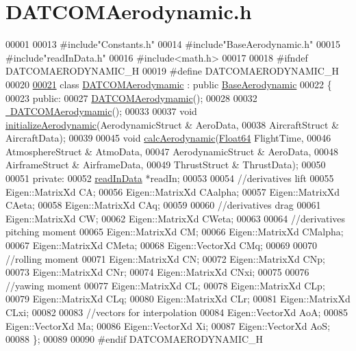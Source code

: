 \hypertarget{_d_a_t_c_o_m_aerodynamic_8h_source}{}\section{D\+A\+T\+C\+O\+M\+Aerodynamic.\+h}
\label{_d_a_t_c_o_m_aerodynamic_8h_source}

\begin{DoxyCode}
00001 
00013 \textcolor{preprocessor}{#include"Constants.h"}
00014 \textcolor{preprocessor}{#include"BaseAerodynamic.h"}
00015 \textcolor{preprocessor}{#include"readInData.h"}
00016 \textcolor{preprocessor}{#include<math.h>}
00017 
00018 \textcolor{preprocessor}{#ifndef DATCOMAERODYNAMIC\_H}
00019 \textcolor{preprocessor}{#define DATCOMAERODYNAMIC\_H}
00020 
\hyperlink{group___aerodynamic}{00021} \textcolor{keyword}{class }\hyperlink{group___aerodynamic_class_d_a_t_c_o_m_aerodymamic}{DATCOMAerodymamic} : \textcolor{keyword}{public} \hyperlink{group___aerodynamic_class_base_aerodynamic}{BaseAerodynamic}
00022 \{
00023 \textcolor{keyword}{public}:
00027     \hyperlink{group___aerodynamic_a03d01a72cf389483e03e2bf6cce33299}{DATCOMAerodymamic}();
00028 
00032     \hyperlink{group___aerodynamic_a3619e38867cad4b0c8b06a939281a74e}{~DATCOMAerodymamic}();
00033 
00037     \textcolor{keywordtype}{void} \hyperlink{group___aerodynamic_ae739c87d390f0ae0a293985478ff5d72}{initializeAerodynamic}(AerodynamicStruct & AeroData, 
00038                                AircraftStruct & AircraftData);
00039 
00045     \textcolor{keywordtype}{void} \hyperlink{group___aerodynamic_a2c31940a25ec9396657d701ef3004327}{calcAerodynamic}(\hyperlink{group___tools_ga3f1431cb9f76da10f59246d1d743dc2c}{Float64} FlightTime,
00046                         AtmosphereStruct & AtmoData,
00047                         AerodynamicStruct & AeroData,
00048                         AirframeStruct & AirframeData,
00049                         ThrustStruct & ThrustData);
00050 
00051 \textcolor{keyword}{private}:
00052     \hyperlink{classread_in_data}{readInData} *readIn;
00053 
00054     \textcolor{comment}{//derivatives lift}
00055     Eigen::MatrixXd CA;
00056     Eigen::MatrixXd CAalpha;
00057     Eigen::MatrixXd CAeta;
00058     Eigen::MatrixXd CAq;
00059 
00060     \textcolor{comment}{//derivatives drag}
00061     Eigen::MatrixXd CW;
00062     Eigen::MatrixXd CWeta;
00063 
00064     \textcolor{comment}{//derivatives pitching moment}
00065     Eigen::MatrixXd CM;
00066     Eigen::MatrixXd CMalpha;
00067     Eigen::MatrixXd CMeta;
00068     Eigen::VectorXd CMq;
00069 
00070     \textcolor{comment}{//rolling moment}
00071     Eigen::MatrixXd CN;
00072     Eigen::MatrixXd CNp;
00073     Eigen::MatrixXd CNr;
00074     Eigen::MatrixXd CNxi;
00075 
00076     \textcolor{comment}{//yawing moment}
00077     Eigen::MatrixXd CL;
00078     Eigen::MatrixXd CLp;
00079     Eigen::MatrixXd CLq;
00080     Eigen::MatrixXd CLr;
00081     Eigen::MatrixXd CLxi;
00082 
00083     \textcolor{comment}{//vectors for interpolation}
00084     Eigen::VectorXd AoA;
00085     Eigen::VectorXd Ma;
00086     Eigen::VectorXd Xi;
00087     Eigen::VectorXd AoS;
00088 \};
00089 
00090 \textcolor{preprocessor}{#endif DATCOMAERODYNAMIC\_H}
\end{DoxyCode}
